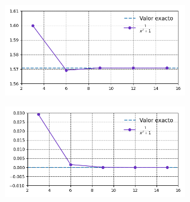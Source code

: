 \begin{enumerate}
          \begin{figure}[H]
              \centering
              \begin{subfigure}[b]{8cm}
                  \includegraphics[width=8cm]{Graphics/problema01_fun_f2.png}
                  \caption{}
              \end{subfigure}
              \begin{subfigure}[b]{8cm}
                  \includegraphics[width=8cm]{Graphics/problema01_diff_f2.png}
                  \caption{}
              \end{subfigure}
              \caption{}
          \end{figure}
\end{enumerate}

